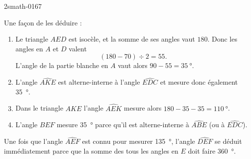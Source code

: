 \begin{corrige}{2smath-0167}
    \begin{center}

    \end{center}
    Une façon de les déduire :
    \begin{enumerate}
        \item
            Le triangle \( AED\) est isocèle, et la somme de ses angles vaut \( 180\). Donc les angles en \( A\) et \( D\) valent
            \begin{equation}
                (180-70)\div 2=55.
            \end{equation}
            L'angle de la partie blanche en \( A\) vaut alors \( 90-55=\SI{35}{\degree}\).
        \item
            L'angle \( \widehat{AKE}\) est alterne-interne à l'angle \( \widehat{EDC}\) et mesure donc également \SI{35}{\degree}.
        \item
            Dans le triangle \( AKE\) l'angle \( \widehat{AEK}\) mesure alors \( 180-35-35=\SI{110}{\degree}\).
        \item
            L'angle \( \widehat{BEF}\) mesure \SI{35}{\degree} parce qu'il est alterne-interne à \( \widehat{ABE}\) (ou à $\widehat{EDC}$).
    \end{enumerate}
    Une fois que l'angle \( \widehat{AEF}\) est connu pour mesurer \SI{135}{\degree}, l'angle $\widehat{DEF}$ se déduit immédiatement parce que la somme des tous les angles en \( E\) doit faire \SI{360}{\degree}.

\end{corrige}
